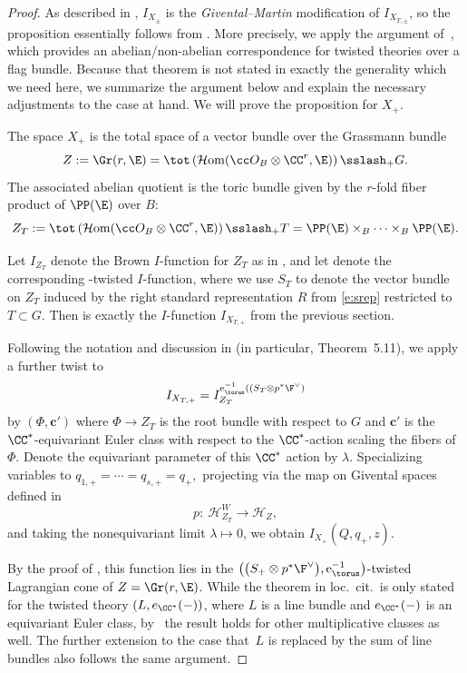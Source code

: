 \begin{proof}

As described in \cite{CLS}, $I_{X_\pm}$ is the \emph{Givental--Martin} modification of $I_{X_{T, \pm}}$, so the proposition essentially follows from \cite[Theorem 1.11]{CLS}.
More precisely, we apply the argument of~\mbox{\cite[Theorem~5.11]{CLS}}, which provides an abelian/non-abelian correspondence for twisted theories over a flag bundle. Because that theorem is not stated in exactly the generality which we need here, we summarize the argument below and explain the necessary adjustments to the case at hand. We will prove the proposition for $X_+$.

The space $X_+$ is the total space of a vector bundle over the Grassmann bundle
\[
Z := \Gr(r, \E) = \tot\left(\mathcal{H}{\rm om}(\cc O_B \otimes \CC^r, \E)\right) \sslash_+ G.
\]
The associated abelian quotient is the toric bundle given by the $r$-fold fiber product of $\PP(\E)$ over $B$:
\[
Z_T := \tot\left(\mathcal{H}{\rm om}(\cc O_B \otimes \CC^r, \E)\right) \sslash_+ T = \PP(\E) \times_B \cdots \times_B \PP(\E).
\]

Let $I_{Z_T}$ denote the Brown $I$-function for $Z_T$ as in \cite{Brown}, and let
 denote the corresponding
-twisted $I$-function, where we use $S_T$ to denote the vector bundle on $Z_T$ induced by the right standard representation $R$ from \eqref{e:srep} restricted to $T \subset G$. Then  is exactly the $I$-function $I_{X_{T,+}}$ from the previous section.

Following the notation and discussion in \cite[Section~5.2]{CLS} (in particular, Theorem~5.11), we apply a further twist to
\[
I_{X_{T,+}} = I_{Z_T}^{ {\rm e}^{-1}_{\torus}( (S_T \otimes p^*\F^\vee)}
\]
by $(\Phi, \mathbf c')$ where $\Phi \to Z_T$ is the root bundle with respect to $G$ and $\mathbf c'$ is the $\CC^*$-equivariant Euler class
with respect to the $\CC^*$-action scaling the fibers of $\Phi$. Denote the equivariant parameter of this $\CC^*$ action by $\lambda$. Specializing variables to
$q_{1, +} = \cdots = q_{s, +} = q_+,$
projecting via the map on Givental spaces defined in \cite{CLS}
\[
p\colon \ \mathcal{H}_{Z_T}^W \to \mathcal{H}_{Z},
\]
and taking the nonequivariant limit $\lambda \mapsto 0$, we obtain $I_{X_+}(Q, q_+, z)$.


By the proof of \cite[Theorem~5.11]{CLS}, this function lies in the $\bigl(\bigl(S_+ \otimes p^*\F^\vee\bigr), {\rm e}^{-1}_{\torus}\bigr)$-twisted Lagrangian cone of $Z = \Gr(r, \E)$. While the theorem in loc.~cit.\ is only stated for the twisted theory $( L, e_{\CC^*}(-))$, where $L$ is a line bundle and $e_{\CC^*}(-)$ is an equivariant Euler class, by~\mbox{\cite[Remark 3.7]{CLS}} the result holds for other multiplicative classes as well. The further extension to the case that~$L$ is replaced by the sum of line bundles also follows the same argument.


\end{proof}

